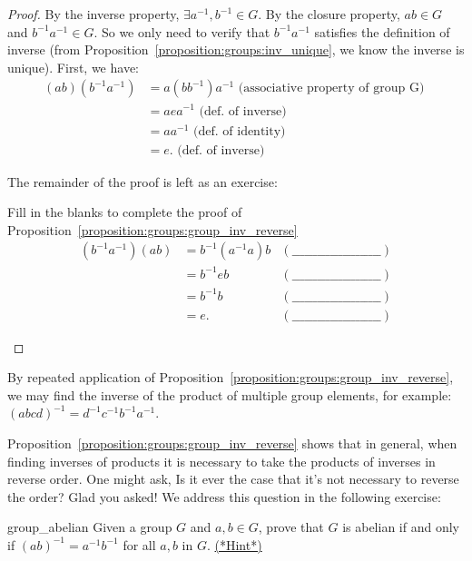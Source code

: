 \begin{proof}
By the inverse property, $ \exists a^{-1}, b^{-1} \in G$. By the closure property, $ab \in G$ and $b^{-1}a^{-1} \in G$. So
we only need to verify that $b^{-1}a^{-1}$ satisfies the definition of inverse (from Proposition~\ref{proposition:groups:inv_unique}, we know the inverse is unique). First, we have:    
\begin{align*}
(ab)(b^{-1}a^{-1}) & = a(bb^{-1})a^{-1}  \text{ (associative property of group G) } \\
 & = aea^{-1}  \text{ (def. of inverse) } \\
 & = aa^{-1}  \text{ (def. of identity) } \\
 & = e.  \text{ (def. of inverse) }
\end{align*}

\noindent
The remainder of the proof is left as an exercise:

\begin{exercise}{42}
Fill in the blanks to complete the proof of Proposition~\ref{proposition:groups:group_inv_reverse}
\begin{align*}
(b^{-1}a^{-1})(ab) & = b^{-1}(a^{-1}a)b  &(\_\_\_\_\_\_\_\_\_\_\_\_\_\_\_\_\_\_\_\_\_) \\
 & = b^{-1}eb  &(\_\_\_\_\_\_\_\_\_\_\_\_\_\_\_\_\_\_\_\_\_) \\
 & = b^{-1}b  &(\_\_\_\_\_\_\_\_\_\_\_\_\_\_\_\_\_\_\_\_\_) \\
 & = e.  &(\_\_\_\_\_\_\_\_\_\_\_\_\_\_\_\_\_\_\_\_\_)
\end{align*}
\end{exercise}
\end{proof}

By repeated application of Proposition~\ref{proposition:groups:group_inv_reverse}, we may find the inverse of the product of multiple group elements, for example: $(abcd)^{-1} = d^{-1}c^{-1}b^{-1}a^{-1}$.

Proposition~\ref{proposition:groups:group_inv_reverse} shows that in general, when finding inverses of products it is necessary to take the products of inverses in reverse order. One might ask, Is it ever the case that it's not necessary to reverse the order? Glad you asked! We address this question in the following exercise: 

\begin{exercise}{group_abelian}
Given a group $G$ and $a, b \in G$, prove that $G$ is abelian if and only if $(ab)^{-1} =a^{-1}b^{-1}$ for all $a,b$ in $G$.
\hyperref[sec:groups:hints]{(*Hint*)} 
\end{exercise}
 
